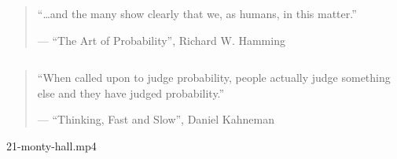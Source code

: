 
\begin{frame}{}
  \begin{CJK*}{UTF8}{gbsn}
    \centerline{}
  \end{CJK*}

  \pause
  \begin{columns}
      \pause
  \end{columns}
\end{frame}

\begin{frame}{}
  \begin{quote}
    ``\ldots and the many  show clearly that we, as humans, 
     in this matter.''

    \hfill --- {\small ``The Art of Probability'', Richard W. Hamming}
  \end{quote}

  \begin{columns}
  \end{columns}

  \pause
  \vspace{0.50cm}
  \begin{quote}
    ``When called upon to judge probability, people actually judge something else
    and \textbf{\textit{}} they have judged probability.''

    \hfill --- {\small ``Thinking, Fast and Slow'', Daniel Kahneman}
  \end{quote}
\end{frame}

\begin{frame}{}
  \begin{center}
    {21-monty-hall.mp4}
  \end{center}
\end{frame}

% 
